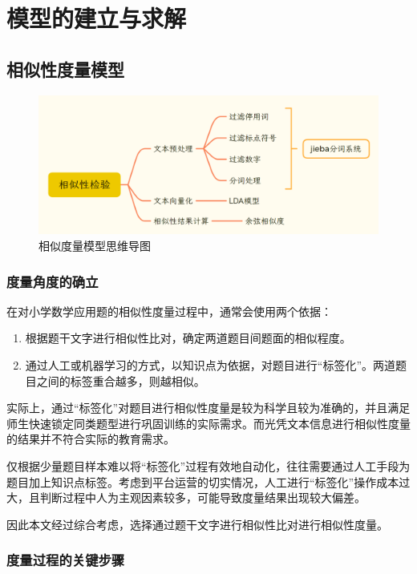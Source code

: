 \section{模型的建立与求解}

\subsection{相似性度量模型}

\begin{figure}[htbp]
    \centering
    \includegraphics[scale=0.2]{res/figure040956.png}
    \caption{相似度量模型思维导图}
\end{figure}

\subsubsection{度量角度的确立}

在对小学数学应用题的相似性度量过程中，通常会使用两个依据：

\begin{enumerate}
    \item 根据题干文字进行相似性比对，确定两道题目间题面的相似程度。
    \item 通过人工或机器学习的方式，以知识点为依据，对题目进行“标签化”。两道题目之间的标签重合越多，则越相似。
\end{enumerate}

实际上，通过“标签化”对题目进行相似性度量是较为科学且较为准确的，并且满足师生快速锁定同类题型进行巩固训练的实际需求。而光凭文本信息进行相似性度量的结果并不符合实际的教育需求。

仅根据少量题目样本难以将“标签化”过程有效地自动化，往往需要通过人工手段为题目加上知识点标签。考虑到平台运营的切实情况，人工进行“标签化”操作成本过大，且判断过程中人为主观因素较多，可能导致度量结果出现较大偏差。

因此本文经过综合考虑，选择通过题干文字进行相似性比对进行相似性度量。

\subsubsection{度量过程的关键步骤}

